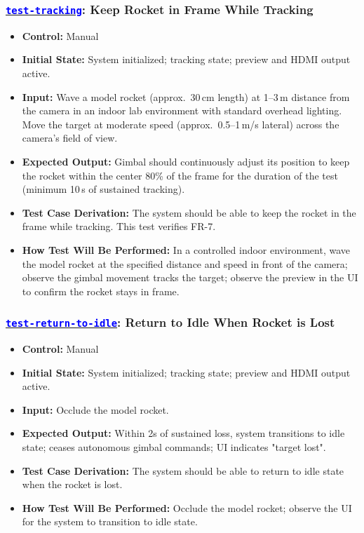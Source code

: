 \documentclass[12pt, titlepage]{article}
\newcommand{\tid}[1]{\hyperlink{tid:#1}{\textcolor{blue}{\texttt{#1}}}}
\begin{document}
\subsubsection*{\tid{test-tracking}: Keep Rocket in Frame While Tracking}
\begin{itemize}
  \item \textbf{Control:} Manual
  \item \textbf{Initial State:} System initialized; tracking state; preview and HDMI output active.
  \item \textbf{Input:} Wave a model rocket (approx.\ 30\,cm length) at 1--3\,m distance from the camera in an indoor lab environment with standard overhead lighting. Move the target at moderate speed (approx.\ 0.5--1\,m/s lateral) across the camera's field of view.
  \item \textbf{Expected Output:} Gimbal should continuously adjust its position to keep the rocket within the center 80\% of the frame for the duration of the test (minimum 10\,s of sustained tracking).
  \item \textbf{Test Case Derivation:} The system should be able to keep the rocket in the frame while tracking. This test verifies FR-7.
  \item \textbf{How Test Will Be Performed:} In a controlled indoor environment, wave the model rocket at the specified distance and speed in front of the camera; observe the gimbal movement tracks the target; observe the preview in the UI to confirm the rocket stays in frame.
\end{itemize}

\subsubsection*{\tid{test-return-to-idle}: Return to Idle When Rocket is Lost}
\begin{itemize}
  \item \textbf{Control:} Manual
  \item \textbf{Initial State:} System initialized; tracking state; preview and HDMI output active.
  \item \textbf{Input:} Occlude the model rocket.
  \item \textbf{Expected Output:} Within 2s of sustained loss, system transitions to idle state; ceases autonomous gimbal commands; UI indicates "target lost".
  \item \textbf{Test Case Derivation:} The system should be able to return to idle state when the rocket is lost.
  \item \textbf{How Test Will Be Performed:} Occlude the model rocket; observe the UI for the system to transition to idle state.
\end{itemize}
\end{document}
